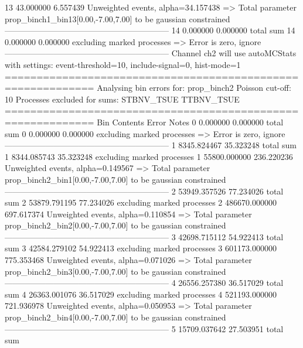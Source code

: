 13         43.000000       6.557439        Unweighted events, alpha=34.157438
  => Total parameter prop_binch1_bin13[0.00,-7.00,7.00] to be gaussian constrained
------------------------------------------------------------
14         0.000000        0.000000        total sum                     
14         0.000000        0.000000        excluding marked processes    
  => Error is zero, ignore      
------------------------------------------------------------
Channel ch2 will use autoMCStats with settings: event-threshold=10, include-signal=0, hist-mode=1
============================================================
Analysing bin errors for: prop_binch2
Poisson cut-off: 10
Processes excluded for sums: STBNV_TSUE TTBNV_TSUE
============================================================
Bin        Contents        Error           Notes                         
0          0.000000        0.000000        total sum                     
0          0.000000        0.000000        excluding marked processes    
  => Error is zero, ignore      
------------------------------------------------------------
1          8345.824467     35.323248       total sum                     
1          8344.085743     35.323248       excluding marked processes    
1          55800.000000    236.220236      Unweighted events, alpha=0.149567
  => Total parameter prop_binch2_bin1[0.00,-7.00,7.00] to be gaussian constrained
------------------------------------------------------------
2          53949.357526    77.234026       total sum                     
2          53879.791195    77.234026       excluding marked processes    
2          486670.000000   697.617374      Unweighted events, alpha=0.110854
  => Total parameter prop_binch2_bin2[0.00,-7.00,7.00] to be gaussian constrained
------------------------------------------------------------
3          42698.715112    54.922413       total sum                     
3          42584.279102    54.922413       excluding marked processes    
3          601173.000000   775.353468      Unweighted events, alpha=0.071026
  => Total parameter prop_binch2_bin3[0.00,-7.00,7.00] to be gaussian constrained
------------------------------------------------------------
4          26556.257380    36.517029       total sum                     
4          26363.001076    36.517029       excluding marked processes    
4          521193.000000   721.936978      Unweighted events, alpha=0.050953
  => Total parameter prop_binch2_bin4[0.00,-7.00,7.00] to be gaussian constrained
------------------------------------------------------------
5          15709.037642    27.503951       total sum                     
